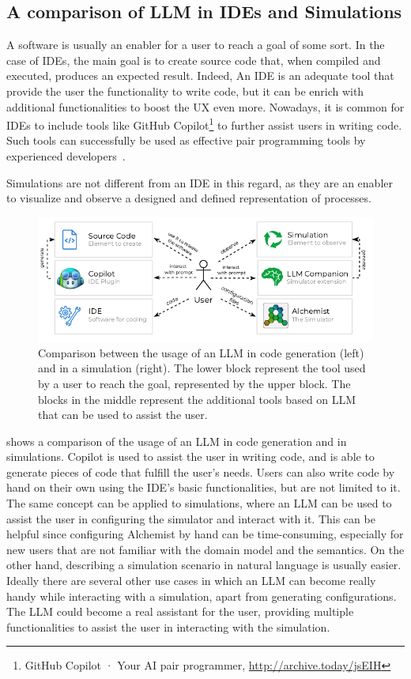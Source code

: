 \documentclass[conference]{IEEEtran}
\begin{document}
\subsection{A comparison of \ac{LLM} in \acp{IDE} and Simulations}
A software is usually an enabler for a user to reach a goal of some sort.
%
In the case of \acp{IDE}, the main goal is to create source code that,
when compiled and executed,
produces an expected result.
%
Indeed,
An IDE is an adequate tool that provide the user the functionality to write code,
but it can be enrich with additional functionalities to boost the \ac{UX} even more.
%
Nowadays,
it is common for \acp{IDE} to include tools like GitHub Copilot\footnote{
    GitHub Copilot · Your AI pair programmer, \url{http://archive.today/jsEIH}
} to further assist users in writing code.
%
Such tools can successfully be used as effective pair programming tools by experienced developers~\cite{DBLP:journals/jss/DakhelMNKDJ23}.
%

Simulations are not different from an \ac{IDE} in this regard,
as they are an enabler to visualize and observe a designed and defined representation of processes.
%
\begin{figure}
    \includegraphics[width=\columnwidth]{use-case}
    \caption{
        Comparison between the usage of an LLM in code generation (left) and in a simulation (right).
        The lower block represent the tool used by a user to reach the goal, represented by the upper block.
        The blocks in the middle represent the additional tools based on LLM that can be used to assist the user.
    }
    \label{fig:usecase}
\end{figure}
%
 shows a comparison of the usage of an \ac{LLM} in code generation and in simulations.
%
Copilot is used to assist the user in writing code,
and is able to generate pieces of code that fulfill the user's needs.
%
Users can also write code by hand on their own using the \ac{IDE}'s basic functionalities,
but are not limited to it.
%
The same concept can be applied to simulations,
where an \ac{LLM} can be used to assist the user in configuring the simulator and interact with it.
%
This can be helpful since configuring Alchemist by hand can be time-consuming,
especially for new users that are not familiar with the domain model and the semantics.
%
On the other hand,
describing a simulation scenario in natural language is usually easier.
%
Ideally
there are several other use cases in which an \ac{LLM} can become really handy while interacting with a simulation, apart from generating configurations.
%
The \ac{LLM} could become a real assistant for the user,
providing multiple functionalities to assist the user in interacting with the simulation.
%
\end{document}
